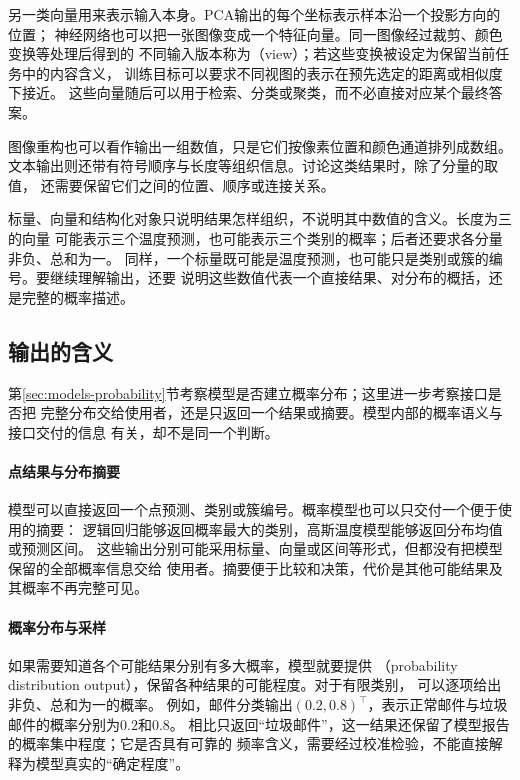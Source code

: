 另一类向量用来表示输入本身。PCA输出的每个坐标表示样本沿一个投影方向的位置；
神经网络也可以把一张图像变成一个特征向量。同一图像经过裁剪、颜色变换等处理后得到的
不同输入版本称为（view）；若这些变换被设定为保留当前任务中的内容含义，
训练目标可以要求不同视图的表示在预先选定的距离或相似度下接近。
这些向量随后可以用于检索、分类或聚类，而不必直接对应某个最终答案。

图像重构也可以看作输出一组数值，只是它们按像素位置和颜色通道排列成数组。
文本输出则还带有符号顺序与长度等组织信息。讨论这类结果时，除了分量的取值，
还需要保留它们之间的位置、顺序或连接关系。

标量、向量和结构化对象只说明结果怎样组织，不说明其中数值的含义。长度为三的向量
可能表示三个温度预测，也可能表示三个类别的概率；后者还要求各分量非负、总和为一。
同样，一个标量既可能是温度预测，也可能只是类别或簇的编号。要继续理解输出，还要
说明这些数值代表一个直接结果、对分布的概括，还是完整的概率描述。

\subsection{输出的含义}
\label{sec:models-output-semantics}

第\ref{sec:models-probability}节考察模型是否建立概率分布；这里进一步考察接口是否把
完整分布交给使用者，还是只返回一个结果或摘要。模型内部的概率语义与接口交付的信息
有关，却不是同一个判断。

\paragraph{点结果与分布摘要}

模型可以直接返回一个点预测、类别或簇编号。概率模型也可以只交付一个便于使用的摘要：
逻辑回归能够返回概率最大的类别，高斯温度模型能够返回分布均值或预测区间。
这些输出分别可能采用标量、向量或区间等形式，但都没有把模型保留的全部概率信息交给
使用者。摘要便于比较和决策，代价是其他可能结果及其概率不再完整可见。

\paragraph{概率分布与采样}
\label{sec:models-distribution-output}

如果需要知道各个可能结果分别有多大概率，模型就要提供
（probability distribution output），保留各种结果的可能程度。对于有限类别，
可以逐项给出非负、总和为一的概率。
例如，邮件分类输出$(0.2,0.8)^{\top}$，表示正常邮件与垃圾邮件的概率分别为$0.2$和$0.8$。
相比只返回“垃圾邮件”，这一结果还保留了模型报告的概率集中程度；它是否具有可靠的
频率含义，需要经过校准检验，不能直接解释为模型真实的“确定程度”。


